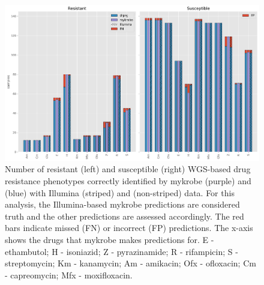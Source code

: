 \begin{figure}
\begin{center}
\includegraphics[width=0.90\columnwidth]{Chapter3/Figs/illumina_concordance.png}
\caption{{Number of resistant (left) and susceptible (right) WGS-based drug resistance phenotypes correctly identified by mykrobe \ont{} (purple) and \drprg{} (blue) with Illumina (striped) and \ont{} (non-striped) data. For this analysis, the Illumina-based mykrobe predictions are considered truth and the other predictions are assessed accordingly. The red bars indicate missed (FN) or incorrect (FP) predictions. The x-axis shows the drugs that mykrobe makes predictions for. E - ethambutol; H - isoniazid; Z - pyrazinamide; R - rifampicin; S - streptomycin; Km - kanamycin; Am - amikacin; Ofx - ofloxacin; Cm - capreomycin; Mfx - moxifloxacin.
{\label{fig:geno-concordance}}
}}
\end{center}
\end{figure}


